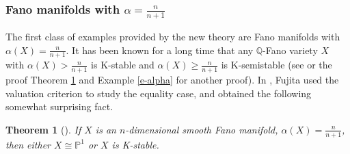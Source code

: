 \documentclass[12pt,reqno]{amsart}%
\newtheorem{thm}{Theorem}[section]
\theoremstyle{definition}
\theoremstyle{remark}
\begin{document}
\subsubsection{Fano manifolds with $\alpha=\frac{n}{n+1}$}
The first class of examples provided by the new theory are Fano manifolds with $\alpha(X)=\frac{n}{n+1}$. It has been known  for a long time that any $\mathbb{Q}$-Fano variety $X$ with $\alpha(X)>\frac{n}{n+1}$ is K-stable and $\alpha(X)\ge \frac{n}{n+1}$ is K-semistable (see \cites{Tia87,OS12} or the proof Theorem \ref{t-alphaequal} and Example \ref{e-alpha} for another proof). In \cite{Fuj19}, Fujita used the valuation criterion to study the equality case, and obtained the following somewhat surprising fact. 
\begin{thm}[{\cite{Fuj19}}]\label{t-alphaequal}
If $X$ is an $n$-dimensional smooth Fano manifold, $\alpha(X)= \frac{n}{n+1}$, then either $X\cong \mathbb{P}^1$ or $X$ is K-stable.
\end{thm}
\end{document}
